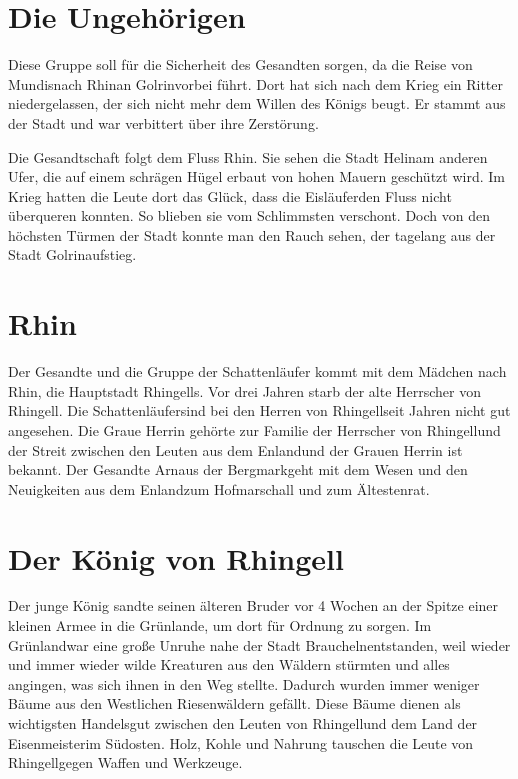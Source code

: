 \documentclass[12pt,a4paper,onecolumn,twoside,ngerman]{book}
\newcommand{\Enland}{Enland}
\newcommand{\Schattenjager}{Schattenläufer}
\newcommand{\Bergmark}{Bergmark}
\newcommand{\Arn}{Arn}
\newcommand{\Eislaufer}{Eisläufer}
\newcommand{\Rhingell}{Rhingell}
\newcommand{\Mundis}{Mundis}
\newcommand{\Helin}{Helin}
\newcommand{\Golrin}{Golrin}
\newcommand{\Rhin}{Rhin}
\newcommand{\Grunland}{Grünland}
\newcommand{\Braucheln}{Braucheln}
\newcommand{\Eisenmeister}{Eisenmeister}
\begin{document}
\section{Die Ungehörigen}

Diese Gruppe soll für die Sicherheit des Gesandten sorgen, da die Reise von \Mundis nach \Rhin an \Golrin vorbei führt. Dort hat sich nach dem Krieg ein Ritter niedergelassen, der sich nicht mehr dem Willen des Königs beugt. Er stammt aus der Stadt und war verbittert über ihre Zerstörung.

Die Gesandtschaft folgt dem Fluss \Rhin . Sie sehen die Stadt \Helin am anderen Ufer, die auf einem schrägen Hügel erbaut von hohen Mauern geschützt wird. Im Krieg hatten die Leute dort das Glück, dass die \Eislaufer den Fluss nicht überqueren konnten. So blieben sie vom Schlimmsten verschont. Doch von den höchsten Türmen der Stadt konnte man den Rauch sehen, der tagelang aus der Stadt \Golrin aufstieg.

\section{\Rhin}

Der Gesandte und die Gruppe der Schattenläufer kommt mit dem Mädchen nach \Rhin, die Hauptstadt \Rhingell{s}. Vor drei Jahren starb der alte Herrscher von \Rhingell. Die \Schattenjager sind bei den Herren von \Rhingell seit Jahren nicht gut angesehen. Die Graue Herrin gehörte zur Familie der Herrscher von \Rhingell und der Streit zwischen den Leuten aus dem \Enland und der Grauen Herrin ist bekannt. Der Gesandte \Arn aus der \Bergmark geht mit dem Wesen und den Neuigkeiten aus dem \Enland zum Hofmarschall und zum Ältestenrat.

\section{Der König von \Rhingell}
Der junge König sandte seinen älteren Bruder vor 4 Wochen an der Spitze einer kleinen Armee in die \Grunland{e}, um dort für Ordnung zu sorgen. Im \Grunland war eine große Unruhe nahe der Stadt \Braucheln entstanden, weil wieder und immer wieder wilde Kreaturen aus den Wäldern stürmten und alles angingen, was sich ihnen in den Weg stellte. Dadurch wurden immer weniger Bäume aus den Westlichen Riesenwäldern gefällt. Diese Bäume dienen als wichtigsten Handelsgut zwischen den Leuten von \Rhingell und dem Land der \Eisenmeister im Südosten. Holz, Kohle und Nahrung tauschen die Leute von \Rhingell gegen Waffen und Werkzeuge.
\end{document}

